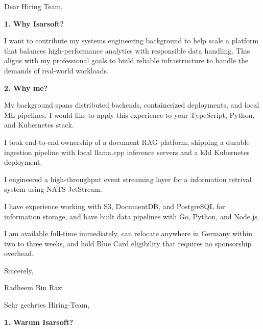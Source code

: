 \documentclass[11pt,a4paper]{coverletter}
\begin{document}

\opening{Dear Hiring Team,}

\vspace{8pt}\noindent\textbf{1. Why Isarsoft?}\par\vspace{3pt}

I want to contribute my systems engineering background to help scale a platform that balances high-performance analytics with responsible data handling. This aligns with my professional goals to build reliable infrastructure to handle the demands of real-world workloads.

\vspace{8pt}\noindent\textbf{2. Why me?}\par\vspace{3pt}

My background spans distributed backends, containerized deployments, and local ML pipelines. I would like to apply this experience to your TypeScript, Python, and Kubernetes stack.

\bullets

  \item I took end-to-end ownership of a document RAG platform, shipping a durable ingestion pipeline with local llama.cpp inference servers and a k3d Kubernetes deployment.

  \item I engineered a high-throughput event streaming layer for a information retrival system using NATS JetStream.

  \item I have experience working with S3, DocumentDB, and PostgreSQL for information storage, and have built data pipelines with Go, Python, and Node.js.

\bulletsend

I am available full-time immediately, can relocate anywhere in Germany within two to three weeks, and hold Blue Card eligibility that requires no sponsorship overhead.

\closing{Sincerely,}{Radheem Bin Razi}

\clearpage
{}


\opening{Sehr geehrtes Hiring-Team,}

\vspace{8pt}\noindent\textbf{1. Warum Isarsoft?}\par\vspace{3pt}
\end{document}
